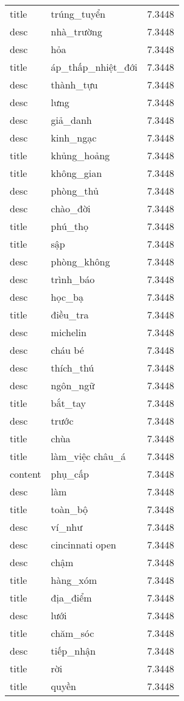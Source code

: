 \documentclass{article}
\begin{document}
\begin{tabular}{lll}
title & trúng\_tuyển & 7.3448\\
desc & nhà\_trường & 7.3448\\
desc & hỏa & 7.3448\\
title & áp\_thấp\_nhiệt\_đới & 7.3448\\
desc & thành\_tựu & 7.3448\\
desc & lưng & 7.3448\\
desc & giả\_danh & 7.3448\\
desc & kinh\_ngạc & 7.3448\\
title & khủng\_hoảng & 7.3448\\
title & không\_gian & 7.3448\\
desc & phòng\_thủ & 7.3448\\
desc & chào\_đời & 7.3448\\
title & phú\_thọ & 7.3448\\
title & sập & 7.3448\\
desc & phòng\_không & 7.3448\\
desc & trình\_báo & 7.3448\\
desc & học\_bạ & 7.3448\\
title & điều\_tra & 7.3448\\
desc & michelin & 7.3448\\
desc & cháu bé & 7.3448\\
desc & thích\_thú & 7.3448\\
desc & ngôn\_ngữ & 7.3448\\
title & bắt\_tay & 7.3448\\
desc & trước & 7.3448\\
title & chùa & 7.3448\\
title & làm\_việc châu\_á & 7.3448\\
content & phụ\_cấp & 7.3448\\
desc & làm & 7.3448\\
title & toàn\_bộ & 7.3448\\
desc & ví\_như & 7.3448\\
desc & cincinnati open & 7.3448\\
desc & chậm & 7.3448\\
title & hàng\_xóm & 7.3448\\
title & địa\_điểm & 7.3448\\
desc & lưới & 7.3448\\
title & chăm\_sóc & 7.3448\\
desc & tiếp\_nhận & 7.3448\\
title & rời & 7.3448\\
title & quyền & 7.3448\\

\end{tabular}
\end{document}
